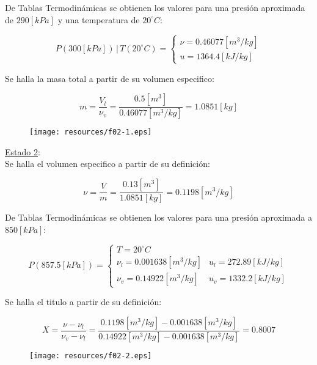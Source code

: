 \documentclass[letter,11pt]{article}
\begin{document}
\begin{enumerate}
De Tablas Termodinámicas se obtienen los valores para una presión aproximada de
$290[kPa]$ y una temperatura de $20^\circ C$:

\begin{equation*}
    P(300[kPa])\,|\,T(20^\circ C) = \begin{cases}
        \nu = 0.46077[m^3/kg] \\
        u = 1364.4[kJ/kg]
    \end{cases}
\end{equation*}

Se halla la masa total a partir de su volumen especifico:

\begin{equation*}
    m = \frac{V_l}{\nu_v} = \frac{0.5[m^3]}{0.46077[m^3/kg]}
      = 1.0851[kg]
\end{equation*}

\begin{figure}[H]
\centering
\texttt{[image: resources/f02-1.eps]}
\end{figure}

\underline{Estado 2}: \\
Se halla el volumen especifico a partir de su definición:

\begin{equation*}
    \nu = \frac{V}{m} = \frac{0.13[m^3]}{1.0851[kg]} = 0.1198[m^3/kg]
\end{equation*}

De Tablas Termodinámicas se obtienen los valores para una presión aproximada a
$850[kPa]$:

\begin{equation*}
    P(857.5[kPa]) = \begin{cases}
        T = 20^\circ C \\
        \nu_l = 0.001638[m^3/kg] & u_l = 272.89[kJ/kg] \\
        \nu_v = 0.14922[m^3/kg]  & u_v = 1332.2[kJ/kg]
    \end{cases}
\end{equation*}

Se halla el titulo a partir de su definición:

\begin{equation*}
    X = \frac{\nu-\nu_l}{\nu_v-\nu_l}
      = \frac{0.1198[m^3/kg] - 0.001638[m^3/kg]}
      {0.14922[m^3/kg] - 0.001638[m^3/kg]}
      = 0.8007
\end{equation*}

\begin{figure}[H]
\centering
\texttt{[image: resources/f02-2.eps]}
\end{figure}


\end{enumerate}
\end{document}
